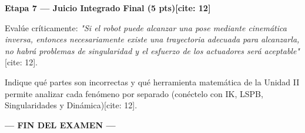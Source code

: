 \documentclass[11pt, a4paper]{article}
\begin{document}
\noindent\textbf{\large Etapa 7 — Juicio Integrado Final (5 pts)[cite: 12]}

Evalúe críticamente: \textit{"Si el robot puede alcanzar una pose mediante cinemática inversa, entonces necesariamente existe una trayectoria adecuada para alcanzarla, no habrá problemas de singularidad y el esfuerzo de los actuadores será aceptable"}[cite: 12].

Indique qué partes son incorrectas y qué herramienta matemática de la Unidad II permite analizar cada fenómeno por separado (conéctelo con IK, LSPB, Singularidades y Dinámica)[cite: 12]. \vspace{4.5cm}

\begin{center}
    \textbf{--- FIN DEL EXAMEN ---}
\end{center}
\end{document}
